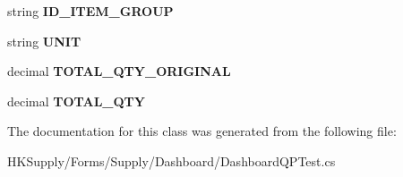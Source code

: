 \begin{DoxyCompactItemize}
\item 
\mbox{\label{class_h_k_supply_1_1_forms_1_1_supply_1_1_dashboard_1_1_aux_dashboard_q_p_stored2_ae3a1b3962845dfa49bd6a15455134ede}} 
string {\bfseries I\+D\+\_\+\+I\+T\+E\+M\+\_\+\+G\+R\+O\+UP}
\item 
\mbox{\label{class_h_k_supply_1_1_forms_1_1_supply_1_1_dashboard_1_1_aux_dashboard_q_p_stored2_a210abcd219a706902e31caa86b727f9e}} 
string {\bfseries U\+N\+IT}
\item 
\mbox{\label{class_h_k_supply_1_1_forms_1_1_supply_1_1_dashboard_1_1_aux_dashboard_q_p_stored2_a17054606efa1cd8ca71b43b477375a3d}} 
decimal {\bfseries T\+O\+T\+A\+L\+\_\+\+Q\+T\+Y\+\_\+\+O\+R\+I\+G\+I\+N\+AL}
\item 
\mbox{\label{class_h_k_supply_1_1_forms_1_1_supply_1_1_dashboard_1_1_aux_dashboard_q_p_stored2_a2a13c2059fdfa5f3c044f806e5ecd9dd}} 
decimal {\bfseries T\+O\+T\+A\+L\+\_\+\+Q\+TY}
\end{DoxyCompactItemize}


The documentation for this class was generated from the following file\+:\begin{DoxyCompactItemize}
\item 
H\+K\+Supply/\+Forms/\+Supply/\+Dashboard/Dashboard\+Q\+P\+Test.\+cs\end{DoxyCompactItemize}
